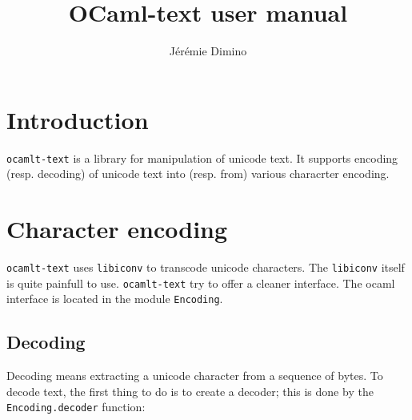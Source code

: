 \documentclass{article}
\title{OCaml-text user manual}
\author{Jérémie Dimino}
\newcommand{\oct}{\texttt{ocamlt-text}\xspace}
\begin{document}
\maketitle


\begin{abstract}

\end{abstract}


\setcounter{tocdepth}{2}
\tableofcontents

\section{Introduction}

\oct is a library for manipulation of unicode text. It supports
encoding (resp. decoding) of unicode text into (resp. from) various
characrter encoding.

\section{Character encoding}

\oct uses \texttt{libiconv} to transcode unicode characters. The
\texttt{libiconv} itself is quite painfull to use. \oct try to offer a
cleaner interface. The ocaml interface is located in the module
\texttt{Encoding}.

\subsection{Decoding}

Decoding means extracting a unicode character from a sequence of
bytes. To decode text, the first thing to do is to create a decoder;
this is done by the \texttt{Encoding.decoder} function:
\end{document}
